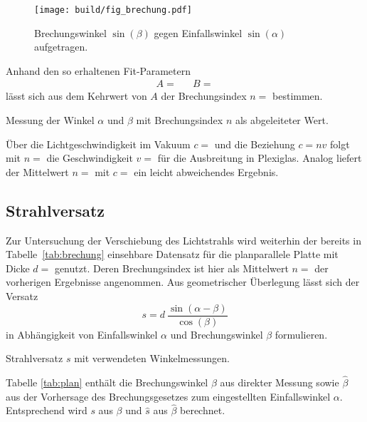 \begin{figure}[H]
	\texttt{[image: build/fig\_brechung.pdf]}
	\caption{Brechungswinkel $\sin(\beta)$ gegen Einfallswinkel $\sin(\alpha)$ aufgetragen.}
	\label{fig:brechung}
\end{figure}

Anhand den so erhaltenen Fit-Parametern
\begin{align*}
	A =  && B = 
\end{align*}
lässt sich aus dem Kehrwert von $A$ der Brechungsindex $n = $ bestimmen. 

\begin{table}[H]
	\centering
	\caption{Messung der Winkel $\alpha$ und $\beta$ mit Brechungsindex $n$ als abgeleiteter Wert.}
	
	\label{tab:brechung}
\end{table}

Über die Lichtgeschwindigkeit im Vakuum $c = $ \cite{scipy} und die Beziehung $c = nv$ folgt mit $n = $
die Geschwindigkeit $v = $ für die Ausbreitung in Plexiglas. Analog liefert der Mittelwert $n = $
mit $c = $ ein leicht abweichendes Ergebnis.



\subsection{Strahlversatz}

Zur Untersuchung der Verschiebung des Lichtstrahls wird weiterhin der bereits in Tabelle~\ref{tab:brechung} einsehbare Datensatz für die
planparallele Platte mit Dicke $d = $ \cite{reflex} genutzt. Deren Brechungsindex ist hier als Mittelwert
$n = $ der vorherigen Ergebnisse angenommen. Aus geometrischer Überlegung lässt sich der Versatz
\begin{equation*}
	s = d \: \frac{\sin(\alpha - \beta)}{\cos(\beta)}
\end{equation*}
in Abhängigkeit von Einfallswinkel $\alpha$ und Brechungswinkel $\beta$ formulieren.

\begin{table}[H]
	\centering
	\caption{Strahlversatz $s$ mit verwendeten Winkelmessungen.}
	
	\label{tab:plan}
\end{table}

Tabelle \ref{tab:plan} enthält die Brechungswinkel $\beta$ aus direkter Messung sowie $\hat{\beta}$ aus der Vorhersage des Brechungsgesetzes zum
eingestellten Einfallswinkel $\alpha$. Entsprechend wird $s$ aus $\beta$ und $\hat{s}$ aus $\hat{\beta}$ berechnet.


